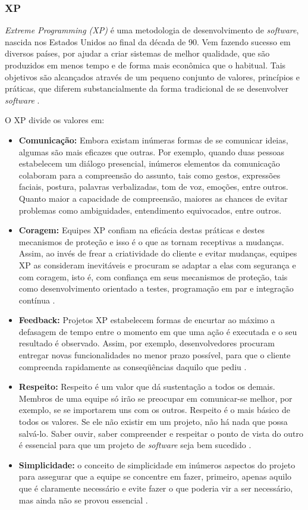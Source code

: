 \documentclass{acm_proc_article-sp}
\begin{document}
\subsubsection{XP}
\textit{Extreme Programming (XP)} é uma metodologia de desenvolvimento de \textit{software}, nascida nos Estados Unidos ao final da década de 90. Vem fazendo sucesso em diversos países, por ajudar a criar sistemas de melhor qualidade, que são produzidos em menos tempo e de forma mais econômica que o habitual. Tais objetivos são alcançados através de um pequeno conjunto de valores, princípios e práticas, que diferem substancialmente da forma tradicional de se desenvolver \textit{software} \cite{xp:agil}.

O XP divide os valores em:

\begin{itemize}
\item \textbf{Comunicação:} Embora existam inúmeras formas de se comunicar ideias, algumas são mais eficazes que outras. Por exemplo, quando duas pessoas estabelecem um diálogo presencial, inúmeros elementos da comunicação colaboram para a compreensão do assunto, tais como gestos, expressões faciais, postura, palavras verbalizadas, tom de voz, emoções, entre outros. Quanto maior a capacidade de compreensão, maiores as chances de evitar problemas como ambiguidades, entendimento equivocados, entre outros\cite{xp:agil}.
\item \textbf{Coragem:} Equipes XP confiam na eficácia destas práticas e destes mecanismos de proteção e isso é o que as tornam receptivas a mudanças. Assim, ao invés de frear a criatividade do cliente e evitar mudanças, equipes XP as consideram inevitáveis e procuram se adaptar a elas com segurança e com coragem, isto é, com confiança em seus mecanismos de proteção, tais como desenvolvimento orientado a testes, programação em par e integração contínua \cite{xp:agil}.
\item \textbf{Feedback:} Projetos XP estabelecem formas de encurtar ao máximo a defasagem de tempo entre o momento em que uma ação é executada e o seu resultado é observado. Assim, por exemplo, desenvolvedores procuram entregar novas funcionalidades no menor prazo possível, para que o cliente compreenda rapidamente as conseqüências daquilo que pediu \cite{xp:agil}.
\item \textbf{Respeito:} Respeito é um valor que dá sustentação a todos os demais. Membros de uma equipe só irão se preocupar em comunicar-se melhor, por exemplo, se se importarem uns com os outros. Respeito é o mais básico de todos os valores. Se ele não existir em um projeto, não há nada que possa salvá-lo. Saber ouvir, saber compreender e respeitar o ponto de vista do outro é essencial para que um projeto de \textit{software} seja bem sucedido \cite{xp:agil}.
\item \textbf{Simplicidade:} o conceito de simplicidade em inúmeros aspectos do projeto para assegurar que a equipe se concentre em fazer, primeiro, apenas aquilo que é claramente necessário e evite fazer o que poderia vir a ser necessário, mas ainda não se provou essencial \cite{xp:agil}.
\end{itemize}
\end{document}
